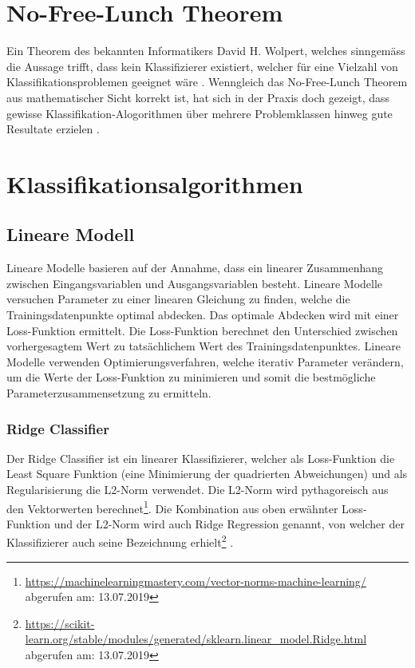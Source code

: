 \section{No-Free-Lunch Theorem}\label{sec:nofreelunch}
Ein Theorem des bekannten Informatikers David H. Wolpert, welches sinngemäss die Aussage trifft, dass kein Klassifizierer existiert, welcher für eine Vielzahl von Klassifikationsproblemen geeignet wäre \cite[p. 1341-1390]{Wolpert1996TheLO}.
Wenngleich das No-Free-Lunch Theorem aus mathematischer Sicht korrekt ist, hat sich in der Praxis doch gezeigt, dass gewisse Klassifikation-Alogorithmen über mehrere Problemklassen hinweg gute Resultate erzielen \cite{fernandez-delgado2014}.
\section{Klassifikationsalgorithmen}\label{sec:algos}
\subsection{Lineare Modell}
Lineare Modelle basieren auf der Annahme, dass ein linearer Zusammenhang zwischen Eingangsvariablen und Ausgangsvariablen besteht.
Lineare Modelle versuchen Parameter zu einer linearen Gleichung zu finden, welche die Trainingsdatenpunkte optimal abdecken.
Das optimale Abdecken wird mit einer Loss-Funktion ermittelt.
Die Loss-Funktion berechnet den Unterschied zwischen vorhergesagtem Wert zu tatsächlichem Wert des Trainingsdatenpunktes.
Lineare Modelle verwenden Optimierungsverfahren, welche iterativ Parameter verändern, um die Werte der Loss-Funktion zu minimieren und somit die bestmögliche Parameterzusammensetzung zu ermitteln.\cite{Frick-Wuersch}
\subsubsection{Ridge Classifier}
Der Ridge Classifier ist ein linearer Klassifizierer, welcher als Loss-Funktion die \glqq Least Square\grqq{} Funktion (eine Minimierung der quadrierten Abweichungen) und als Regularisierung die L2-Norm verwendet. Die L2-Norm wird pythagoreisch aus den Vektorwerten berechnet\footnote{\url{https://machinelearningmastery.com/vector-norms-machine-learning/} abgerufen am: 13.07.2019}.
Die Kombination aus oben erwähnter Loss-Funktion und der L2-Norm wird auch \glqq Ridge Regression\grqq{} genannt, von welcher der Klassifizierer auch seine Bezeichnung erhielt\footnote{\url{https://scikit-learn.org/stable/modules/generated/sklearn.linear_model.Ridge.html} abgerufen am: 13.07.2019} \cite{scikit-learn}.
